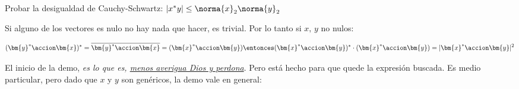 \begin{enunciado}{\ejExtra}
  Probar la desigualdad de Cauchy-Schwartz: $|x^*y| \leq \norma{x}_2 \norma{y}_2$
\end{enunciado}

Si alguno de los vectores es nulo no hay nada que hacer, es trivial. Por lo tanto si $x,\, y$ no nulos:

$$
  (\bm{y}^* \accion \bm{x})^* = \overline{\bm{y}^* \accion \bm{x}}  =  (\bm{x}^* \accion \bm{y})
  \entonces
  (\bm{x}^* \accion \bm{y})^* \cdot (\bm{x}^* \accion \bm{y}) = |\bm{x}^* \accion \bm{y}|^2
$$

El inicio de la demo, \textit{es lo que es, \ul{menos averigua Dios y perdona}}. Pero está hecho para que quede la expresión buscada.
Es medio particular, pero dado que $x$ y $y$ son genéricos, la demo vale en general:
